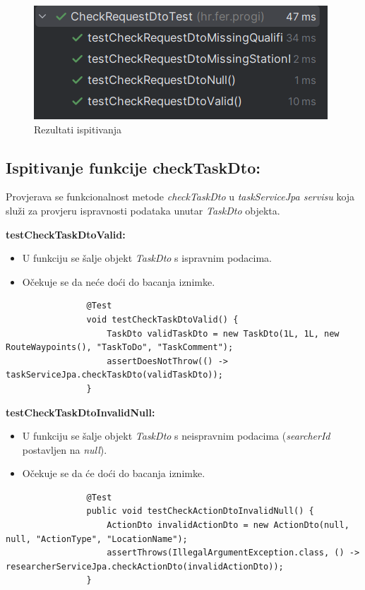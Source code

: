 			\begin{figure}[H]
				\includegraphics[scale=1]{slike/checkRequestDtoTest.png} 
				\centering
				\caption{Rezultati ispitivanja}
				\label{fig:checkRequestDtoTest}
			\end{figure}
			
			\subsection{Ispitivanje funkcije checkTaskDto:}
			Provjerava se funkcionalnost metode \textit{checkTaskDto} u \textit{taskServiceJpa servisu} koja služi za provjeru ispravnosti podataka unutar \textit{TaskDto} objekta.
			
			\textbf{testCheckTaskDtoValid:}
			\begin{itemize}
				\item U funkciju se šalje objekt \textit{TaskDto} s ispravnim podacima.
				\item Očekuje se da neće doći do bacanja iznimke.
			\end{itemize}
			\begin{lstlisting}
				@Test
				void testCheckTaskDtoValid() {
					TaskDto validTaskDto = new TaskDto(1L, 1L, new RouteWaypoints(), "TaskToDo", "TaskComment");
					assertDoesNotThrow(() -> taskServiceJpa.checkTaskDto(validTaskDto));
				}
			\end{lstlisting}
			
			\textbf{testCheckTaskDtoInvalidNull:}
			\begin{itemize}
				\item U funkciju se šalje objekt \textit{TaskDto} s neispravnim podacima (\textit{searcherId} postavljen na \textit{null}).
				\item Očekuje se da će doći do bacanja iznimke.
			\end{itemize}
			\begin{lstlisting}
				@Test
				public void testCheckActionDtoInvalidNull() {
					ActionDto invalidActionDto = new ActionDto(null, null, "ActionType", "LocationName");
					assertThrows(IllegalArgumentException.class, () -> researcherServiceJpa.checkActionDto(invalidActionDto));
				}
			\end{lstlisting}
			

